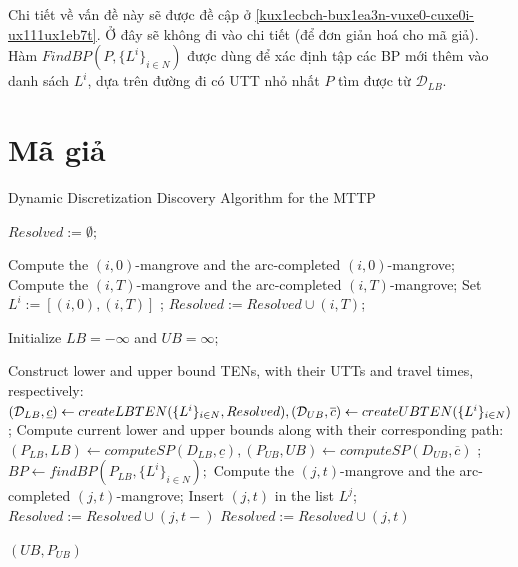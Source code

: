 \documentclass[../main.tex]{subfiles}
\begin{document}
Chi tiết về vấn đề này sẽ được đề cập ở \autoref{kux1ecbch-bux1ea3n-vuxe0-cuxe0i-ux111ux1eb7t}. 
Ở đây sẽ không đi vào chi tiết (để đơn giản hoá cho mã giả). Hàm \(FindBP(P, \{L^i\}_{i\in N})\) được dùng để xác định tập các BP
mới thêm vào danh sách \(L^i\), dựa trên đường đi có UTT nhỏ nhất
\(P\) tìm được từ \(\mathcal{D}_{LB}\). 

\section{Mã giả}

\begin{algorithm}
\caption{Dynamic Discretization Discovery Algorithm for the MTTP}
\label{algo:2}
\begin{algorithmic}
    
\State $Resolved := \emptyset;$


    \State Compute the $(i, 0)$-mangrove and the arc-completed $(i, 0)$-mangrove; 
    \State Compute the $(i, T)$-mangrove and the arc-completed $(i, T)$-mangrove; 
    \State Set $L^i := [(i, 0), (i, T )]$ ;
    \State $Resolved := Resolved \cup {(i, T )}$;
\EndFor

\State Initialize $LB = −\infty$ and $UB = \infty$; 

    \State Construct lower and upper bound TENs, with their UTTs and travel times, respectively:
        \State  $(\mathcal{D}_{LB},\underline{c}) \gets createLBTEN(\{L^i\}_{i\in N},Resolved), \\(\mathcal{D}_{UB},\overline{c}) \gets createUBTEN(\{L^i\}_{i\in N})$ ;
    \State Compute current lower and upper bounds along with their corresponding path:
        \State  $(P_{LB},LB)\gets computeSP(D_{LB},\underline{c}),(P_{UB},UB) \gets computeSP(D_{UB},\overline{c})$ ;
    \State $BP \gets findBP(P_{LB},\{L^i\}_{i\in N}) ;$
    \EndFor 
        \State Compute the $(j, t)$-mangrove and the arc-completed $(j, t)$-mangrove;
        \State Insert $(j,t)$ in the list $L^j$;
        \State          $Resolved := Resolved \cup {(j, t−)}$
        \EndIf
        \State  $Resolved := Resolved \cup {(j, t)}$ 

        \EndIf  
\EndWhile

\Return $(UB,P_{UB})$

    \end{algorithmic}
\end{algorithm}

\backmatter
\end{document}
